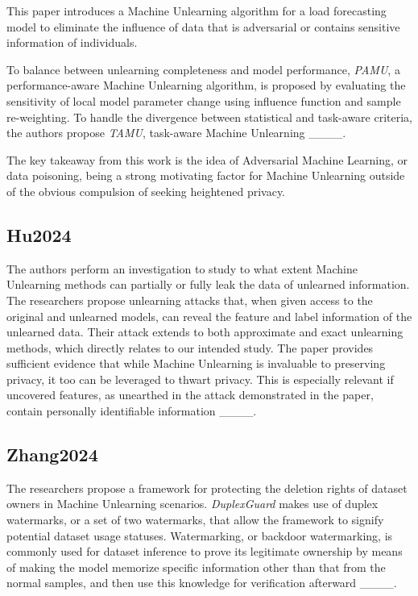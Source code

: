         This paper introduces a Machine Unlearning algorithm for a load forecasting model to eliminate the influence of data that is adversarial or contains sensitive information of individuals. 
        
        To balance between unlearning completeness and model performance, \textit{PAMU}, a performance-aware Machine Unlearning algorithm, is proposed by evaluating the sensitivity of local model parameter change using influence function and sample re-weighting. To handle the divergence between statistical and task-aware criteria, the authors propose \textit{TAMU}, task-aware Machine Unlearning ____.
        
        The key takeaway from this work is the idea of Adversarial Machine Learning, or data poisoning, being a strong motivating factor for Machine Unlearning outside of the obvious compulsion of seeking heightened privacy.
    
    \subsection{Hu2024}
    \label{subsec:Hu2024}
    
        The authors perform an investigation to study to what extent Machine Unlearning methods can partially or fully leak the data of unlearned information. The researchers propose unlearning attacks that, when given access to the original and unlearned models, can reveal the feature and label information of the unlearned data. Their attack extends to both approximate and exact unlearning methods, which directly relates to our intended study. The paper provides sufficient evidence that while Machine Unlearning is invaluable to preserving privacy, it too can be leveraged to thwart privacy. This is especially relevant if uncovered features, as unearthed in the attack demonstrated in the paper, contain personally identifiable information ____.
    
    \subsection{Zhang2024}
    \label{subsec:Zhang2024}
    
        The researchers propose a framework for protecting the deletion rights of dataset owners in Machine Unlearning scenarios. \textit{DuplexGuard} makes use of duplex watermarks, or a set of two watermarks, that allow the framework to signify potential dataset usage statuses. Watermarking, or backdoor watermarking, is commonly used for dataset inference to prove its legitimate ownership by means of making the model memorize specific information other than that from the normal samples, and then use this knowledge for verification afterward ____.
        
